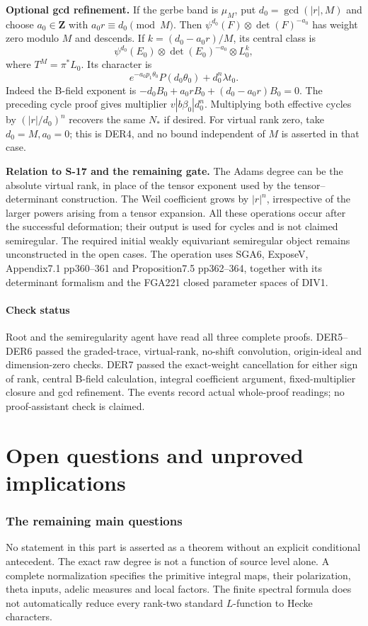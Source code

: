 \documentclass[11pt,a4paper]{article}
\theoremstyle{definition}
\begin{document}
\textbf{Optional gcd refinement.} If the gerbe band is \(\mu_M\), put
\(d_0=\gcd(|r|,M)\) and choose \(a_0\in\mathbf Z\) with
\(a_0r\equiv d_0\pmod M\). Then \(\psi^{d_0}(F)\otimes\det(F)^{-a_0}\)
has weight zero modulo \(M\) and descends. If \(k=(d_0-a_0r)/M\), its
central class is \[
 \psi^{d_0}(E_0)\otimes\det(E_0)^{-a_0}\otimes L_0^k,
\] where \(T^M=\pi^*L_0\). Its character is \[
 e^{-a_0p_1\theta_0}P(d_0\theta_0)+d_0^n\lambda t_0.
\] Indeed the B-field exponent is \(-d_0B_0+a_0rB_0+(d_0-a_0r)B_0=0\).
The preceding cycle proof gives multiplier \(v|b\beta_0|d_0^n\).
Multiplying both effective cycles by \((|r|/d_0)^n\) recovers the same
\(N_*\) if desired. For virtual rank zero, take \(d_0=M,a_0=0\); this is
DER4, and no bound independent of \(M\) is asserted in that case.

\textbf{Relation to S-17 and the remaining gate.} The Adams degree can
be the absolute virtual rank, in place of the tensor exponent used by
the tensor--determinant construction. The Weil coefficient grows by
\(|r|^n\), irrespective of the larger powers arising from a tensor
expansion. All these operations occur after the successful deformation;
their output is used for cycles and is not claimed semiregular. The
required initial weakly equivariant semiregular object remains
unconstructed in the open cases. The operation uses SGA6, ExposeV,
Appendix7.1 pp360--361 and Proposition7.5 pp362--364, together with its
determinant formalism and the FGA221 closed parameter spaces of DIV1.

\subsection{Check status}\label{check-status}

Root and the semiregularity agent have read all three complete proofs.
DER5--DER6 passed the graded-trace, virtual-rank, no-shift convolution,
origin-ideal and dimension-zero checks. DER7 passed the exact-weight
cancellation for either sign of rank, central B-field calculation,
integral coefficient argument, fixed-multiplier closure and gcd
refinement. The events record actual whole-proof readings; no
proof-assistant check is claimed.

\clearpage
\part{Open questions and unproved implications}
\section{The remaining main questions}
No statement in this part is asserted as a theorem without an explicit
conditional antecedent. The exact raw degree is not a function of source
level alone. A complete normalization specifies the primitive integral
maps, their polarization, theta inputs, adelic measures and local factors.
The finite spectral formula does not automatically reduce every rank-two
standard $L$-function to Hecke characters.
\end{document}
